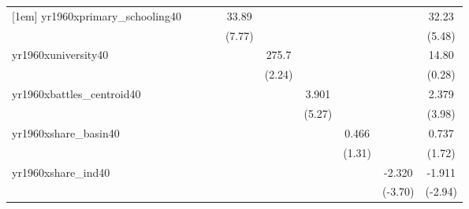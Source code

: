 {\begin{tabular}{l*{9}{c}}
[1em]
yr1960xprimary\_schooling40&                     &                     &                     &       33.89\sym{***}&                     &                     &                     &                     &       32.23\sym{***}\\
            &                     &                     &                     &      (7.77)         &                     &                     &                     &                     &      (5.48)         \\
[1em]
yr1960xuniversity40&                     &                     &                     &                     &       275.7\sym{*}  &                     &                     &                     &       14.80         \\
            &                     &                     &                     &                     &      (2.24)         &                     &                     &                     &      (0.28)         \\
[1em]
yr1960xbattles\_centroid40&                     &                     &                     &                     &                     &       3.901\sym{***}&                     &                     &       2.379\sym{***}\\
            &                     &                     &                     &                     &                     &      (5.27)         &                     &                     &      (3.98)         \\
[1em]
yr1960xshare\_basin40&                     &                     &                     &                     &                     &                     &       0.466         &                     &       0.737         \\
            &                     &                     &                     &                     &                     &                     &      (1.31)         &                     &      (1.72)         \\
[1em]
yr1960xshare\_ind40&                     &                     &                     &                     &                     &                     &                     &      -2.320\sym{***}&      -1.911\sym{**} \\
            &                     &                     &                     &                     &                     &                     &                     &     (-3.70)         &     (-2.94)         \\

\end{tabular}}
